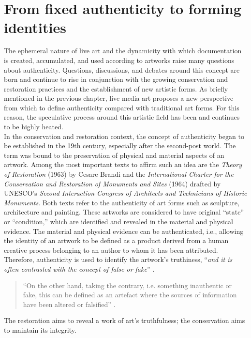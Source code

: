 \section{From fixed authenticity to forming identities}
The ephemeral nature of live art and the dynamicity with which documentation is created, accumulated, and used according to artworks raise many questions about authenticity. Questions, discussions, and debates around this concept are born and continue to rise in conjunction with the growing conservation and restoration practices and the establishment of new artistic forms. As briefly mentioned in the previous chapter, live media art proposes a new perspective from which to define authenticity compared with traditional art forms. For this reason, the speculative process around this artistic field has been and continues to be highly heated.\\
In the conservation and restoration context, the concept of authenticity began to be established in the 19th century, especially after the second-post world. The term was bound to the preservation of physical and material aspects of an artwork. Among the most important texts to affirm such an idea are the \textit{Theory of Restoration} (1963) by Cesare Brandi \cite{Brandi2005theory} and the \textit{International Charter for the Conservation and Restoration of Monuments and Sites} (1964) \cite{venicecharter1964} drafted by UNESCO’s \textit{Second Interaction Congress of Architects and Technicians of Historic Monuments}. Both texts refer to the authenticity of art forms such as sculpture, architecture and painting. These artworks are considered to have original ``state'' or ``condition,'' which are identified and revealed in the material and physical evidence. The material and physical evidence can be authenticated, i.e., allowing the identity of an artwork to be defined as a product derived from a human creative process belonging to an author to whom it has been attributed. Therefore, authenticity is used to identify the artwork’s truthiness, ``\textit{and it is often contrasted with the concept of false or fake}'' \cite{jokilehto2010conservation}.
\begin{quote}
    “On the other hand, taking the contrary, i.e. something inauthentic or fake, this can be defined as an artefact where the sources of information have been altered or falsified” \cite{jokilehto2010conservation}.
\end{quote}
The restoration aims to reveal a work of art’s truthfulness; the conservation aims to maintain its integrity. 

